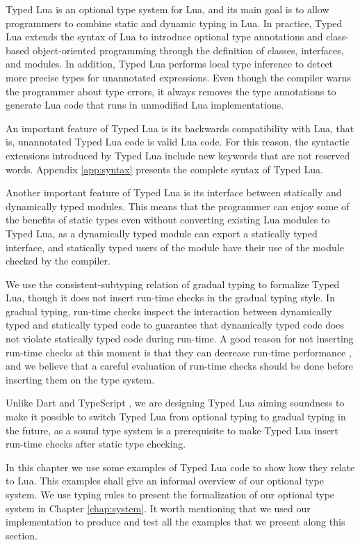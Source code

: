 Typed Lua is an optional type system for Lua, and its main goal is to
allow programmers to combine static and dynamic typing in Lua.
In practice, Typed Lua extends the syntax of Lua to introduce
optional type annotations and class-based object-oriented
programming through the definition of classes, interfaces, and
modules.
In addition, Typed Lua performs local type inference \citep{pierce2000lti}
to detect more precise types for unannotated expressions.
Even though the compiler warns the programmer about type errors,
it always removes the type annotations to generate Lua code that
runs in unmodified Lua implementations.

An important feature of Typed Lua is its backwards compatibility with Lua,
that is, unannotated Typed Lua code is valid Lua code.
For this reason, the syntactic extensions introduced by Typed Lua
include new keywords that are not reserved words.
Appendix \ref{app:syntax} presents the complete syntax of Typed Lua.

Another important feature of Typed Lua is its interface between
statically and dynamically typed modules.
This means that the programmer can enjoy some of the benefits of
static types even without converting existing Lua modules to Typed Lua,
as a dynamically typed module can export a statically typed interface,
and statically typed users of the module have their use of the module
checked by the compiler.

We use the consistent-subtyping relation of gradual typing
\citep{siek2007objects,siek2013mutable} to formalize Typed Lua,
though it does not insert run-time checks in the gradual typing style.
In gradual typing, run-time checks inspect the interaction between
dynamically typed and statically typed code to guarantee that dynamically
typed code does not violate statically typed code during run-time.
A good reason for not inserting run-time checks at this moment is that they
can decrease run-time performance \citep{allende2013cis}, and we believe that
a careful evaluation of run-time checks should be done before inserting them
on the type system.

Unlike Dart \citep{dart} and TypeScript \citep{typescript},
we are designing Typed Lua aiming soundness to make it possible to switch
Typed Lua from optional typing to gradual typing in the future,
as a sound type system is a prerequisite to make Typed Lua insert
run-time checks after static type checking.

In this chapter we use some examples of Typed Lua code to show how
they relate to Lua.
This examples shall give an informal overview of our optional type system.
We use typing rules to present the formalization of our optional type system
in Chapter \ref{chap:system}.
It worth mentioning that we used our implementation to produce and
test all the examples that we present along this section.

